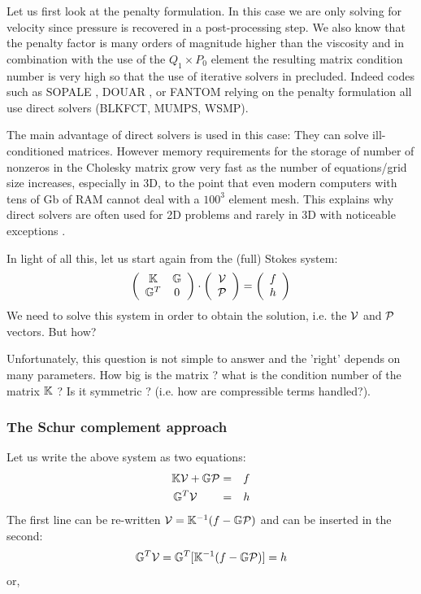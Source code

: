 
Let us first look at the penalty formulation. In this case we are only solving for 
velocity since pressure is recovered in a post-processing step. We also know that 
the penalty factor is many orders of magnitude higher than the viscosity and 
in combination with the use of the $Q_1 \times P_0$ element the resulting matrix 
condition number is very high so that the use of iterative solvers in precluded. 
Indeed codes such as SOPALE \cite{full95}, DOUAR \cite{brtf08}, or FANTOM \cite{thie11} 
relying on the penalty formulation all use direct solvers (BLKFCT, MUMPS, WSMP).

The main advantage of direct solvers is used in this case: They can solve ill-conditioned 
matrices. However memory requirements for the storage of number of nonzeros in the 
Cholesky matrix grow very fast as the number of equations/grid size increases, especially in 3D,
to the point that even modern computers with tens of Gb of RAM cannot deal with a $100^3$ element mesh.
This explains why direct solvers are often used for 2D problems and rarely in 3D with noticeable 
exceptions \cite{thfb08,yahb09,brya09,lobh10,alht11,alht12,alhf13,whbb14,neew18}. 

In light of all this, let us start again from the (full) Stokes system:
\[
\left(
\begin{array}{cc}
{\mathbb{K}} & {\mathbb{G}} \\ {\mathbb{G}}^T & 0 
\end{array}
\right)
\cdot
\left(
\begin{array}{c}
{\cal V} \\ {\cal P}
\end{array}
\right)
=
\left(
\begin{array}{c}
 f \\ h
\end{array}
\right)
\]
We need to solve this system in order to obtain the solution, i.e. the ${\cal V}$ 
and ${\cal P}$ vectors. But how? 

Unfortunately, this question is not simple to answer and the 'right' depends on many 
parameters. 
How big is the matrix ? what is the condition number of the matrix ${\mathbb{K}}$ ? 
Is it symmetric ? (i.e. how are compressible terms handled?). 


\subsubsection{The Schur complement approach}
Let us write the above system as two equations:
\begin{eqnarray}
{\mathbb{K}} {\cal V} + {\mathbb{G}} {\cal P} &=& f \\
{\mathbb{G}}^T {\cal V} \quad\quad &=& h 
\end{eqnarray}
The first line can be re-written ${\cal V}={\mathbb{K}}^{-1} (f - {\mathbb{G}} {\cal P})$ and can be inserted in the second:
\[
{\mathbb{G}}^T {\cal V} ={\mathbb{G}}^T [ {\mathbb{K}}^{-1} (f - {\mathbb{G}} {\cal P}) ] = h 
\]
or, 

